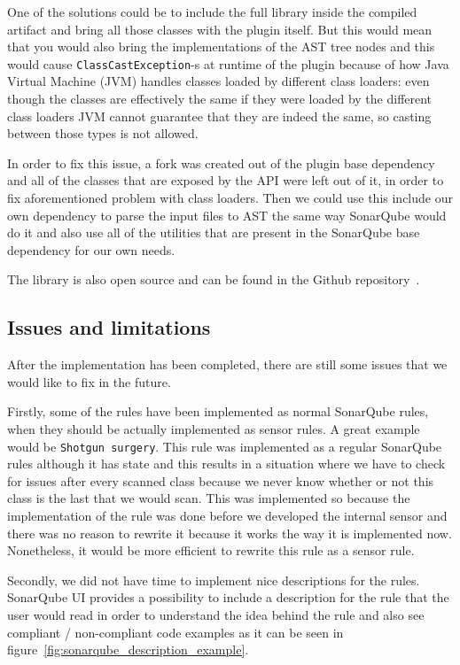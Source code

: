 One of the solutions could be to include the full library inside the compiled artifact and bring all those classes with
the plugin itself.
But this would mean that you would also bring the implementations of the AST tree nodes and this would cause
\verb|ClassCastException|-s at runtime of the plugin because of how Java Virtual Machine (JVM) handles classes loaded
by different class loaders: even though the classes are effectively the same if they were loaded by the different class loaders
JVM cannot guarantee that they are indeed the same, so casting between those types is not allowed.

In order to fix this issue, a fork was created out of the plugin base dependency and all of the classes
that are exposed by the API were left out of it, in order to fix aforementioned problem with class loaders.
Then we could use this include our own dependency to parse the input files to AST the same way SonarQube would do it
and also use all of the utilities that are present in the SonarQube base dependency for our own needs.

The library is also open source and can be found in the Github repository~\cite{sonar_java_extracted}.

\subsection{Issues and limitations}\label{subsec:issues-and-limitations}


After the implementation has been completed, there are still some issues that we would like to fix in the future.

Firstly, some of the rules have been implemented as normal SonarQube rules, when they should be actually implemented
as sensor rules.
A great example would be \verb|Shotgun surgery|.
This rule was implemented as a regular SonarQube rules although it has state and this results in a situation where
we have to check for issues after every scanned class because we never know whether or not this class is the last that
we would scan.
This was implemented so because the implementation of the rule was done before we developed the internal sensor 
and there was no reason to rewrite it because it works the way it is implemented now.
Nonetheless, it would be more efficient to rewrite this rule as a sensor rule.

Secondly, we did not have time to implement nice descriptions for the rules.
SonarQube UI provides a possibility to include a description for the rule that the user would read in order
to understand the idea behind the rule and also see compliant / non-compliant code examples as it can be seen
in figure~\ref{fig:sonarqube_description_example}.

